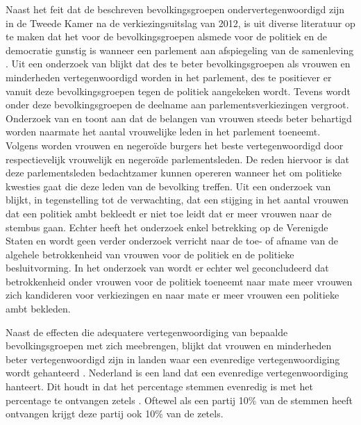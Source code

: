 Naast het feit dat de beschreven bevolkingsgroepen ondervertegenwoordigd zijn in de Tweede Kamer na de verkiezingsuitslag van 2012, is uit diverse literatuur op te maken dat het voor de bevolkingsgroepen alsmede voor de politiek en de democratie gunstig is wanneer een parlement aan afspiegeling van de samenleving  \citep{tremblay1998female,anwar2001participation}. Uit een onderzoek van \cite{banducci2004minority} blijkt dat des te beter bevolkingsgroepen als vrouwen en minderheden vertegenwoordigd worden in het parlement, des te positiever er vanuit deze bevolkingsgroepen tegen de politiek aangekeken wordt. Tevens wordt onder deze bevolkingsgroepen de deelname aan parlementsverkiezingen vergroot. Onderzoek van \cite{wangnerud2009women} en \cite{sainsbury2004women} toont aan dat de belangen van vrouwen steeds beter behartigd worden naarmate het aantal vrouwelijke leden in het parlement toeneemt. Volgens \cite{mansbridge1999should} worden vrouwen en negeroïde burgers het beste vertegenwoordigd door respectievelijk vrouwelijk en negeroïde parlementsleden. De reden hiervoor is dat deze parlementsleden bedachtzamer kunnen opereren wanneer het om politieke kwesties gaat die deze leden van de bevolking treffen. Uit een onderzoek van \cite{broockman2014female} blijkt, in tegenstelling tot de verwachting, dat een stijging in het aantal vrouwen dat een politiek ambt bekleedt er niet toe leidt dat er meer vrouwen naar de stembus gaan. Echter heeft het onderzoek enkel betrekking op de Verenigde Staten en wordt geen verder onderzoek verricht naar de toe- of afname van de algehele betrokkenheid van vrouwen voor de politiek en de politieke besluitvorming. In het onderzoek van \cite{karp2008politics} wordt er echter wel geconcludeerd dat betrokkenheid onder vrouwen voor de politiek toeneemt naar mate meer vrouwen zich kandideren voor verkiezingen en naar mate er meer vrouwen een politieke ambt bekleden. 

Naast de effecten die adequatere vertegenwoordiging van bepaalde bevolkingsgroepen met zich meebrengen, blijkt dat vrouwen en minderheden beter vertegenwoordigd zijn in landen waar een evenredige vertegenwoordiging wordt gehanteerd \citep{macivor1999proportional,mcallister2002electoral,studlar1999will,welch1990multi}.  Nederland is een land dat een evenredige vertegenwoordiging hanteert. Dit houdt in dat het percentage stemmen evenredig is met het percentage te ontvangen zetels \citep{Kiess35:online}. Oftewel als een partij 10\% van de stemmen heeft ontvangen krijgt deze partij ook 10\% van de zetels.

